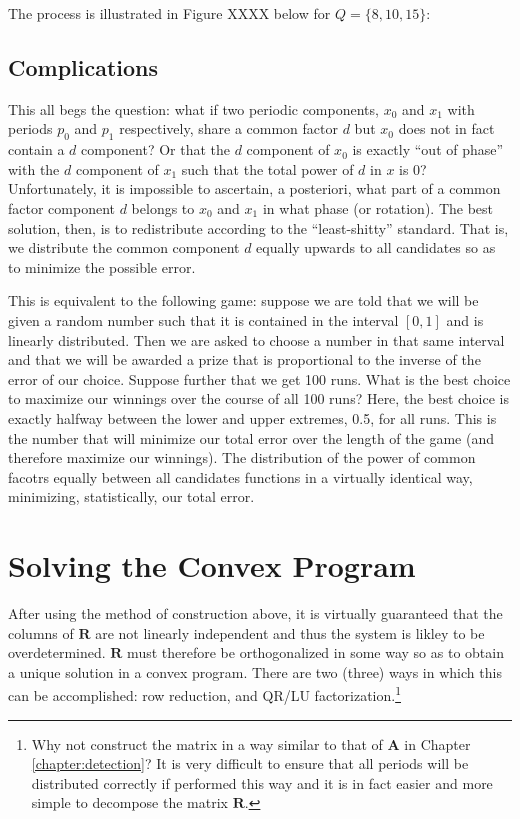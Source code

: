 The process is illustrated in Figure XXXX below for $Q = \{8, 10, 15\}$:

    \subsection{Complications}
    This all begs the question: what if two periodic components, $x_0$ and $x_1$ with periods $p_0$ and $p_1$ respectively, share a common factor $d$ but $x_0$ does not in fact contain a $d$ component? Or that the $d$ component of $x_0$ is exactly ``out of phase'' with the $d$ component of $x_1$ such that the total power of $d$ in $x$ is 0? Unfortunately, it is impossible to ascertain, a posteriori, what part of a common factor component $d$ belongs to $x_0$ and $x_1$ in what phase (or rotation). The best solution, then, is to redistribute according to the ``least-shitty'' standard. That is, we distribute the common component $d$ equally upwards to all candidates so as to minimize the possible error.

    This is equivalent to the following game: suppose we are told that we will be given a random number such that it is contained in the interval $[0, 1]$ and is linearly distributed. Then we are asked to choose a number in that same interval and that we will be awarded a prize that is proportional to the inverse of the error of our choice. Suppose further that we get 100 runs. What is the best choice to maximize our winnings over the course of all 100 runs? Here, the best choice is exactly halfway between the lower and upper extremes, 0.5, for all runs. This is the number that will minimize our total error over the length of the game (and therefore maximize our winnings). The distribution of the power of common facotrs equally between all candidates functions in a virtually identical way, minimizing, statistically, our total error.


\section{Solving the Convex Program}
After using the method of construction above, it is virtually guaranteed that the columns of $\bm{R}$ are not linearly independent and thus the system is likley to be overdetermined. $\bm{R}$ must therefore be orthogonalized in some way so as to obtain a unique solution in a convex program. There are two (three) ways in which this can be accomplished: row reduction, and QR/LU factorization.\footnote{Why not construct the matrix in a way similar to that of $\bm{A}$ in Chapter \ref{chapter:detection}? It is very difficult to ensure that all periods will be distributed correctly if performed this way and it is in fact easier and more simple to decompose the matrix $\bm{R}$.}

